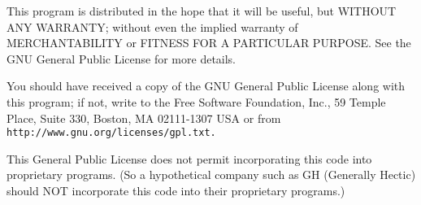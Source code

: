 This program is distributed in the hope that it will be useful, but WITHOUT ANY WARRANTY; without even the implied warranty of MERCHANTABILITY or FITNESS FOR A PARTICULAR PURPOSE. See the GNU General Public License for more details.

You should have received a copy of the GNU General Public License along with this program; if not, write to the Free Software Foundation, Inc., 59 Temple Place, Suite 330, Boston, MA 02111-1307 USA or from {\tt http://www.gnu.org/licenses/gpl.txt.}

This General Public License does not permit incorporating this code into proprietary programs. (So a hypothetical company such as GH (Generally Hectic) should NOT incorporate this code into their proprietary programs.) 